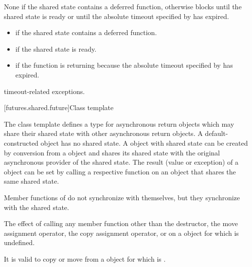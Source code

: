 \begin{itemdescr}
\pnum
{}%
\effects
None if the shared state contains a deferred function,
otherwise
blocks until the shared state is ready or until
the absolute timeout specified by  has expired.

\pnum
\returns

\begin{itemize}
\item {} if the shared state contains a deferred
function.

\item {} if the shared state is ready.

\item {} if the function is returning because the
absolute timeout
specified by  has expired.
\end{itemize}

\pnum
\throws
timeout-related exceptions.
\end{itemdescr}


[futures.shared.future]{Class template }

\pnum
The class template  defines a type for asynchronous return objects
which may share their shared state with other asynchronous return
objects. A default-constructed 
object has no shared state. A  object with
shared state can
be created
by conversion from a  object and shares its shared state with the
original asynchronous provider of the shared state.
The result (value or exception) of a  object
can be set by
calling a respective function on an
object that shares the same shared state.

\pnum
\begin{note}
Member functions of  do not synchronize with themselves,
but they synchronize with the shared state.
\end{note}

\pnum
The effect of calling any member function other than the destructor,
the move assignment operator, the copy assignment operator, or
 on a  object for which  is undefined.
\begin{note}
It is valid to copy or move from a 
object for which  is .
\end{note}

